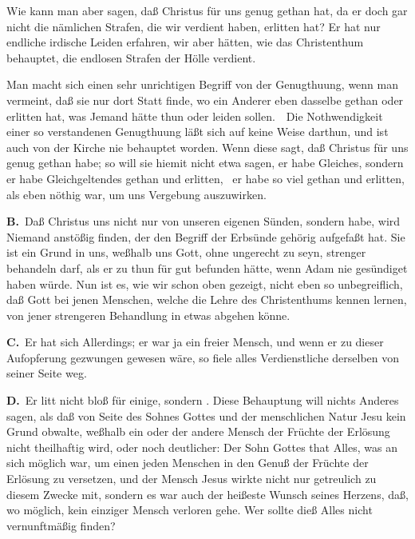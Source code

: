\begin{aufza}
 Wie kann man aber sagen, daß Christus für uns genug gethan hat, da er doch gar nicht die nämlichen Strafen, die wir verdient haben, erlitten hat? Er hat nur endliche irdische Leiden erfahren, wir aber hätten, wie das Christenthum behauptet, die endlosen Strafen der Hölle verdient.\par
{} Man macht sich einen sehr unrichtigen Begriff von der Genugthuung, wenn man vermeint, daß sie nur dort Statt finde, wo ein Anderer eben dasselbe gethan oder erlitten hat, was Jemand hätte thun oder leiden sollen.~\ Die Nothwendigkeit einer so verstandenen Genugthuung läßt sich auf keine Weise darthun, und ist auch von der Kirche nie behauptet worden. Wenn diese sagt, daß Christus für uns genug gethan habe; so will sie hiemit nicht etwa sagen, er habe Gleiches, sondern er habe Gleichgeltendes gethan und erlitten, \dh\ er habe so viel gethan und erlitten, als eben nöthig war, um uns Vergebung auszuwirken.\par

\vabst \textbf{B.}~Daß Christus uns nicht nur von unseren eigenen Sünden, sondern  habe, wird Niemand anstößig finden, der den Begriff der Erbsünde gehörig aufgefaßt hat. Sie ist ein Grund in uns, weßhalb uns Gott, ohne ungerecht zu seyn, strenger behandeln darf, als er zu thun für gut befunden hätte, wenn Adam nie gesündiget haben würde. Nun ist es, wie wir schon oben gezeigt, nicht eben so unbegreiflich, daß Gott bei jenen Menschen, welche die Lehre des Christenthums kennen lernen, von jener strengeren Behandlung in etwas abgehen könne.\par

\vabst \textbf{C.}~Er hat sich  Allerdings; er war ja ein freier Mensch, und wenn er zu dieser Aufopferung gezwungen gewesen wäre, so fiele alles Verdienstliche derselben von seiner Seite weg.\par

\vabst \textbf{D.}~Er litt nicht bloß für einige, sondern . Diese Behauptung will nichts Anderes sagen, als daß von Seite des Sohnes Gottes und der menschlichen Natur Jesu kein Grund obwalte, weßhalb ein oder der andere Mensch der Früchte der Erlösung nicht theilhaftig wird, oder noch deutlicher: Der Sohn Gottes that Alles, was an sich möglich war, um einen jeden Menschen in den Genuß der Früchte der Erlösung zu versetzen, und der Mensch Jesus wirkte nicht nur getreulich zu diesem Zwecke mit, sondern es war auch der heißeste Wunsch seines Herzens, daß, wo möglich, kein einziger Mensch verloren gehe. Wer sollte dieß Alles nicht vernunftmäßig finden?\par


\end{aufza}
